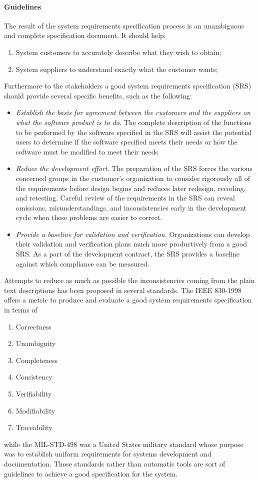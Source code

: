 \paragraph{Guidelines} The result of the system requirements specification process is an unambiguous and complete specification document. It should help:
\begin{enumerate}[label=\alph*)]
\item System customers to accurately describe what they wish to obtain;
\item System suppliers to understand exactly what the customer wants;
\end{enumerate}
Furthermore to the stakeholders a good system requirements specification (SRS) should provide several specific benefits, such as the following:
\begin{itemize}[label={--}]
\item \textit{Establish the basis for agreement between the customers and the suppliers on what the software
product is to do}. The complete description of the functions to be performed by the software specified
in the SRS will assist the potential users to determine if the software specified meets their needs or
how the software must be modified to meet their needs
\item \textit{Reduce the development effort}. The preparation of the SRS forces the various concerned groups in
the customer’s organization to consider rigorously all of the requirements before design begins and
reduces later redesign, recoding, and retesting. Careful review of the requirements in the SRS can
reveal omissions, misunderstandings, and inconsistencies early in the development cycle when these
problems are easier to correct.
\item \textit{Provide a baseline for validation and verification.} Organizations can develop their validation and
verification plans much more productively from a good SRS. As a part of the development contract,
the SRS provides a baseline against which compliance can be measured.
\end{itemize}
\par Attempts to reduce as much as possible the inconsistencies coming from the plain text descriptions has been proposed in several standards. The IEEE 830-1998 \citep{ieee1998ieee} offers a metric to produce and evaluate a good system requirements specification in terms of 
\begin{enumerate}[label=\alph*)]
\item Correctness
\item Unambiguity
\item Completeness
\item Consistency
\item Verifiability
\item Modifiability
\item Traceability
\end{enumerate}
while the MIL-STD-498 \citep{united1994mil} was a United States military standard whose purpose was to establish uniform requirements for systems development and documentation. Those standards rather than automatic tools are sort of guidelines to achieve a good specification for the system.

